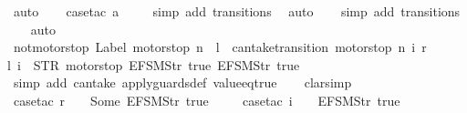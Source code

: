 \begin{isabellebody}
\ auto{\isacharbrackleft}{}{\isacharbrackright}\isanewline
\ \ \isamarkupfalse%
\ {\isacharparenleft}case{\isacharunderscore}tac\ {\isachardoublequoteopen}a{\isacharequal}{}{\isachardoublequoteclose}{\isacharparenright}\isanewline
\ \ \ \isamarkupfalse%
\ {\isacharparenleft}simp\ add{\isacharcolon}\ transitions{\isacharparenright}\ \isamarkupfalse%
\ auto{\isacharbrackleft}{}{\isacharbrackright}\isanewline
\ \ \isamarkupfalse%
\ {\isacharparenleft}simp\ add{\isacharcolon}\ transitions{\isacharparenright}\isanewline
\ \ \isamarkupfalse%
\ auto%
\endisatagproof
{\isafoldproof}%
%
\isadelimproof
\isanewline
%
\endisadelimproof
\isanewline
{}\isamarkupfalse%
\ not{\isacharunderscore}motorstop{\isacharcolon}\ {\isachardoublequoteopen}Label\ {\isacharparenleft}motorstop\ n{\isacharparenright}\ {\isacharequal}\ l\ {\isasymand}\ can{\isacharunderscore}take{\isacharunderscore}transition\ {\isacharparenleft}motorstop\ n{\isacharparenright}\ i\ r\ {\isasymLongrightarrow}\isanewline
{\isacharparenleft}l{\isacharcomma}\ i{\isacharparenright}\ {\isacharequal}\ {\isacharparenleft}STR\ {\isacharprime}{\isacharprime}motorstop{\isacharprime}{\isacharprime}{\isacharcomma}\ {\isacharbrackleft}EFSM{\isachardot}Str\ {\isacharprime}{\isacharprime}true{\isacharprime}{\isacharprime}{\isacharcomma}\ EFSM{\isachardot}Str\ {\isacharprime}{\isacharprime}true{\isacharprime}{\isacharprime}{\isacharbrackright}{\isacharparenright}{\isachardoublequoteclose}\isanewline
%
\isadelimproof
\ \ %
\endisadelimproof
%
\isatagproof
{}\isamarkupfalse%
\ {\isacharparenleft}simp\ add{\isacharcolon}\ can{\isacharunderscore}take\ apply{\isacharunderscore}guards{\isacharunderscore}def\ value{\isacharunderscore}eq{\isacharunderscore}true{\isacharparenright}\isanewline
\ \ \isamarkupfalse%
\ clarsimp\isanewline
\ \ \isamarkupfalse%
\ {\isacharparenleft}case{\isacharunderscore}tac\ {\isachardoublequoteopen}r\ {\isachardollar}\ {}\ {\isacharequal}\ Some\ {\isacharparenleft}EFSM{\isachardot}Str\ {\isacharprime}{\isacharprime}true{\isacharprime}{\isacharprime}{\isacharparenright}{\isachardoublequoteclose}{\isacharparenright}\isanewline
\ \ \ \isamarkupfalse%
\ {\isacharparenleft}case{\isacharunderscore}tac\ {\isachardoublequoteopen}i\ {\isacharbang}\ {}\ {\isacharequal}\ {\isacharparenleft}EFSM{\isachardot}Str\ {\isacharprime}{\isacharprime}true{\isacharprime}{\isacharprime}{\isacharparenright}{\isachardoublequoteclose}{\isacharparenright}\isanewline

\end{isabellebody}
